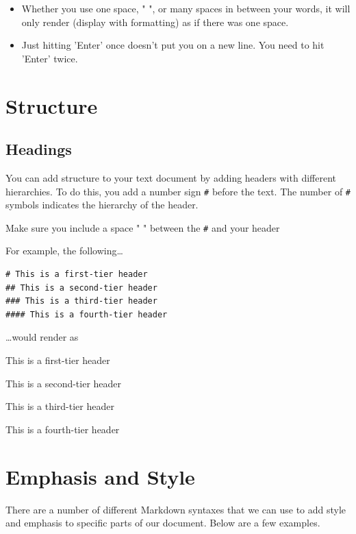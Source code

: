 \documentclass[
]{book}
\providecommand{\tightlist}{%
  \setlength{\itemsep}{0pt}\setlength{\parskip}{0pt}}
\begin{document}
\begin{itemize}
\tightlist
\item
  Whether you use one space, " ", or many spaces in between your words, it will only render (display with formatting) as if there was one space.
\item
  Just hitting 'Enter' once doesn't put you on a new line. You need to hit 'Enter' twice.
\end{itemize}

\hypertarget{structure-1}{%
\section{Structure}\label{structure-1}}

\hypertarget{headings}{%
\subsection*{Headings}\label{headings}}

You can add structure to your text document by adding headers with different hierarchies. To do this, you add a number sign \texttt{\#} before the text. The number of \texttt{\#} symbols indicates the hierarchy of the header.

Make sure you include a space " " between the \texttt{\#} and your header

For example, the following\ldots{}

\begin{verbatim}
# This is a first-tier header
## This is a second-tier header
### This is a third-tier header
#### This is a fourth-tier header
\end{verbatim}

\ldots would render as

This is a first-tier header

This is a second-tier header

This is a third-tier header

This is a fourth-tier header

\hypertarget{emphasis-and-style}{%
\section{Emphasis and Style}\label{emphasis-and-style}}

There are a number of different Markdown syntaxes that we can use to add style and emphasis to specific parts of our document. Below are a few examples.
\end{document}
